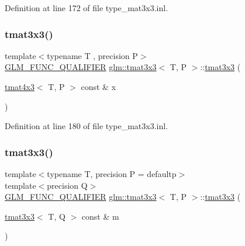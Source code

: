 Definition at line 172 of file type\+\_\+mat3x3.\+inl.

\mbox{\label{structglm_1_1tmat3x3_aca274ab9905b48dac255a6ae295dc193}} 
\subsubsection{\texorpdfstring{tmat3x3()}{tmat3x3()}\hspace{0.1cm}{\footnotesize\ttfamily [18/22]}}
{\footnotesize\ttfamily template$<$typename T , precision P$>$ \\
\mbox{\hyperlink{setup_8hpp_a33fdea6f91c5f834105f7415e2a64407}{G\+L\+M\+\_\+\+F\+U\+N\+C\+\_\+\+Q\+U\+A\+L\+I\+F\+I\+ER}} \mbox{\hyperlink{structglm_1_1tmat3x3}{glm\+::tmat3x3}}$<$ T, P $>$\+::\mbox{\hyperlink{structglm_1_1tmat3x3}{tmat3x3}} (\begin{DoxyParamCaption}\item[{\mbox{\hyperlink{structglm_1_1tmat4x3}{tmat4x3}}$<$ T, P $>$ const \&}]{x }\end{DoxyParamCaption})}



Definition at line 180 of file type\+\_\+mat3x3.\+inl.

\mbox{\label{structglm_1_1tmat3x3_a7d0662c2d46d1709c245e21181f3adff}} 
\subsubsection{\texorpdfstring{tmat3x3()}{tmat3x3()}\hspace{0.1cm}{\footnotesize\ttfamily [19/22]}}
{\footnotesize\ttfamily template$<$typename T, precision P = defaultp$>$ \\
template$<$precision Q$>$ \\
\mbox{\hyperlink{setup_8hpp_a33fdea6f91c5f834105f7415e2a64407}{G\+L\+M\+\_\+\+F\+U\+N\+C\+\_\+\+Q\+U\+A\+L\+I\+F\+I\+ER}} \mbox{\hyperlink{structglm_1_1tmat3x3}{glm\+::tmat3x3}}$<$ T, P $>$\+::\mbox{\hyperlink{structglm_1_1tmat3x3}{tmat3x3}} (\begin{DoxyParamCaption}\item[{\mbox{\hyperlink{structglm_1_1tmat3x3}{tmat3x3}}$<$ T, Q $>$ const \&}]{m }\end{DoxyParamCaption})}



